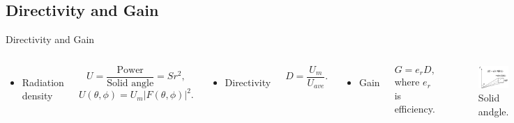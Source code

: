 \subsection{Directivity and Gain}
\begin{frame}{Directivity and Gain}
    \cite{Balanis_2012} \cite{Kraus-2002-AntennasB}
    \begin{columns}
            \begin{itemize}
                \item Radiation density
            \end{itemize}
            \begin{equation*}
                U = \dfrac{\text{Power}}{\text{Solid angle}} = S r^2,
            \end{equation*}
            \begin{equation*}
                U (\theta, \phi) = U_m \left| F(\theta, \phi) \right|^2.
            \end{equation*}

            \begin{itemize}
                \item Directivity
            \end{itemize}
            \begin{equation*}
                D = \dfrac{U_m}{U_{ave}}.
            \end{equation*}
            
            \begin{itemize}
                \item Gain
            \end{itemize}
            \begin{equation*}
                G = e_r D,
            \end{equation*}
            where \(e_r\) is efficiency.
        \begin{figure}
            \centering
            \includegraphics[width=\textwidth]{Figures/Solid_angle.pdf}
            \caption{Solid andgle.}
            \label{fig:Solid_angle}
        \end{figure}
    \end{columns}
\end{frame}